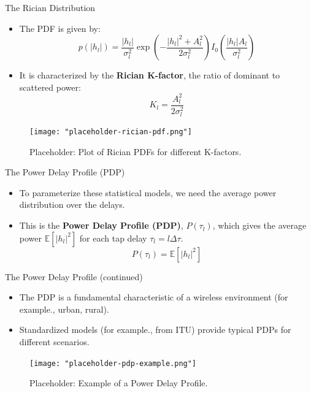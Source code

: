 \documentclass{beamer}
\begin{document}
	\begin{frame}{The Rician Distribution}
		\begin{itemize}
			\item The PDF is given by:
			\[ p(|h_l|) = \frac{|h_l|}{\sigma_l^2} \exp\left(-\frac{|h_l|^2 + A_l^2}{2\sigma_l^2}\right) I_0\left(\frac{|h_l|A_l}{\sigma_l^2}\right) \]
			
			\item It is characterized by the \textbf{Rician K-factor}, the ratio of dominant to scattered power:
			\[ K_l = \frac{A_l^2}{2\sigma_l^2} \]
		\end{itemize}
		\begin{figure}
			\centering
			\texttt{[image: "placeholder-rician-pdf.png"]}
			\caption{Placeholder: Plot of Rician PDFs for different K-factors.}
		\end{figure}
	\end{frame}
	
	\begin{frame}{The Power Delay Profile (PDP)}
		\begin{itemize}
			\item To parameterize these statistical models, we need the average power distribution over the delays.
			
			\item This is the \textbf{Power Delay Profile (PDP)}, $P(\tau_l)$, which gives the average power $\mathbb{E}[|h_l|^2]$ for each tap delay $\tau_l = l\Delta\tau$.
			\[ P(\tau_l) = \mathbb{E}[|h_l|^2] \]
		\end{itemize}
	\end{frame}
	
	\begin{frame}{The Power Delay Profile (continued)}
		\begin{itemize}
			\item The PDP is a fundamental characteristic of a wireless environment (for example., urban, rural). 
			\item Standardized models (for example., from ITU) provide typical PDPs for different scenarios.
		\end{itemize}
		\begin{figure}
			\centering
			\texttt{[image: "placeholder-pdp-example.png"]}
			\caption{Placeholder: Example of a Power Delay Profile.}
		\end{figure}
	\end{frame}
	
\end{document}
